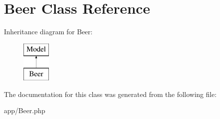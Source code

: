 \hypertarget{class_app_1_1_beer}{}\section{Beer Class Reference}
\label{class_app_1_1_beer}
Inheritance diagram for Beer\+:\begin{figure}[H]
\begin{center}
\leavevmode
\includegraphics[height=2.000000cm]{class_app_1_1_beer}
\end{center}
\end{figure}


The documentation for this class was generated from the following file\+:\begin{DoxyCompactItemize}
\item 
app/Beer.\+php\end{DoxyCompactItemize}
